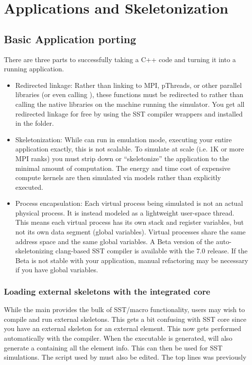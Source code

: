 
\chapter{Applications and Skeletonization}
\label{chap:appsAndSkeletonization}

\section{Basic Application porting}
\label{sec:skel:basic}
There are three parts to successfully taking a C++ code and turning it into a running application.
\begin{itemize}
\item Redirected linkage: Rather than linking to MPI, pThreads, or other parallel libraries (or even calling ), these functions must be redirected to \sstmacro rather than calling the native libraries on the machine running the simulator.
You get all redirected linkage for free by using
the SST compiler wrappers  and  installed in the  folder.
\item Skeletonization: While \sstmacro can run in emulation mode, executing your entire application exactly, this is not scalable.  To simulate at scale (i.e. 1K or more MPI ranks) you must strip down or ``skeletonize'' the application to the minimal amount of computation.  The energy and time cost of expensive compute kernels are then simulated via models rather than explicitly executed. 

\item Process encapsulation: Each virtual process being simulated is not an actual physical process. It is instead modeled as a lightweight user-space thread.  This means each virtual process has its own stack and register variables, but not its own data segment (global variables).
Virtual processes share the same address space and the same global variables.  A Beta version of the auto-skeletonizing clang-based SST compiler is available with the 7.0 release. If the Beta is not stable with your application, manual refactoring may be necessary if you have global variables.

\end{itemize}

\subsection{Loading external skeletons with the integrated core}\label{subsec:linkageCore}
While the main  provides the bulk of SST/macro functionality, 
users may wish to compile and run external skeletons.  This gets a bit confusing with SST core since you have an external skeleton for an external element.  
This now gets performed automatically with the  compiler. 
When the executable is generated, \sstmacro will also generate a  containing all the element info.
This can then be used for SST simulations.
The  script used by  must also be edited.  The top lines was previously

